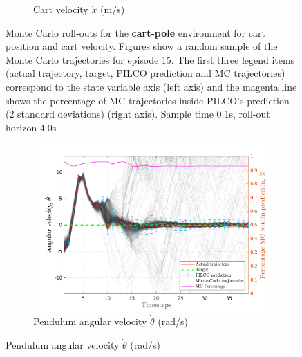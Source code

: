 \begin{figure}[htbp]
\begin{subfigure}[b]{1\linewidth}
    \caption{Cart velocity $\dot x$ (m/s)} 
    \label{Fig:Re-cp-cart-velocity} 
  \end{subfigure} 
\caption[Monte Carlo roll-outs for \textbf{cart-pole} cart position and cart velocity]{Monte Carlo roll-outs for the \textbf{cart-pole} environment for cart position and cart velocity. Figures show a random sample of the Monte Carlo trajectories for episode 15. The first three legend items (actual trajectory, target, PILCO prediction and MC trajectories) correspond to the state variable axis (left axis) and the magenta line shows the percentage of MC trajectories inside PILCO's prediction (2 standard deviations) (right axis). Sample time 0.1s, roll-out horizon 4.0s}
\label{Fig:Re-cp-MC-roll-outs-1} 
\end{figure}
 
 
\begin{figure}[htbp]    
  \begin{subfigure}[b]{1\linewidth}
    \centering
    \includegraphics[height=0.4\textheight,width=1\textwidth]{Chapter3/Figures/cp_MC_rollout_Ep_15_Dim_3.png} 
    \caption{Pendulum angular velocity $\dot \theta$ (rad/s)} 
    \label{Fig:Re-cp-pen-velocity} 
  \end{subfigure} 


\end{figure}
